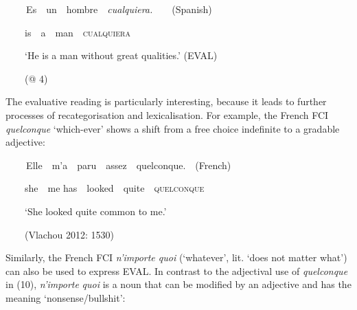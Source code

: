 \clearpage\begin{styleStandard}
\textbf{\ \ }\ \ Es\ \ un\ \ hombre\ \ \textit{cualquiera.}\ \ \ \ (Spanish)
\end{styleStandard}

\begin{styleStandard}
\ \ \ \ is\ \ a\ \ man\ \ \textsc{cualquiera}\ \ \ \ 
\end{styleStandard}

\begin{styleStandard}
\ \ \ \ ‘He is a man without great qualities.’ (EVAL)
\end{styleStandard}

\begin{styleStandard}
\ \ \ \ (@ 4)
\end{styleStandard}

\begin{styleStandard}
The evaluative reading is particularly interesting, because it leads to further processes of recategorisation and lexicalisation. For example, the French FCI \textit{quelconque} ‘which-ever’ shows a shift from a free choice indefinite to a gradable adjective:
\end{styleStandard}

\clearpage\begin{styleStandard}
\textbf{\ \ }\ \ Elle\ \ m’a\ \ paru\ \ assez\ \ quelconque.\ \ (French)
\end{styleStandard}

\begin{styleStandard}
\ \ \ \ she\ \ me has\ \ looked\ \ quite\ \ \textsc{quelconque \ \ }
\end{styleStandard}

\begin{styleStandard}
\ \ \ \ ‘She looked quite common to me.’ \ \ 
\end{styleStandard}

\begin{styleStandard}
\ \ \ \ (Vlachou 2012: 1530)
\end{styleStandard}

\begin{styleStandard}
Similarly, the French FCI \textit{n’importe quoi} (‘whatever’, lit. ‘does not matter what’) can also be used to express EVAL. In contrast to the adjectival use of \textit{quelconque} in (10), \textit{n’importe} \textit{quoi} is a noun that can be modified by an adjective and has the meaning ‘nonsense/bullshit’:
\end{styleStandard}

